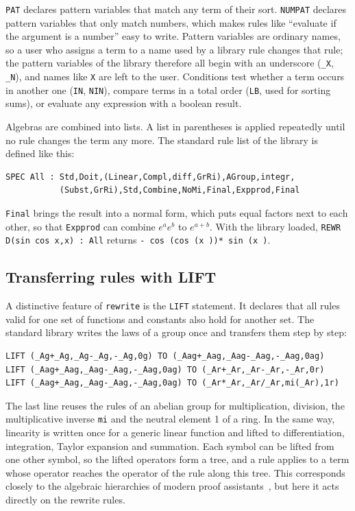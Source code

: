 \documentclass[11pt,a4paper]{article}
\begin{document}
\texttt{PAT} declares pattern variables that match any term of their sort.
\texttt{NUMPAT} declares pattern variables that only match numbers, which makes
rules like ``evaluate if the argument is a number'' easy to write. Pattern
variables are ordinary names, so a user who assigns a term to a name used
by a library rule changes that rule; the pattern variables of the library
therefore all begin with an underscore (\texttt{\_X}, \texttt{\_N}), and
names like \texttt{X} are left to the user.
Conditions test whether a term occurs in another one (\texttt{IN},
\texttt{NIN}), compare terms in a total order (\texttt{LB}, used for
sorting sums), or evaluate any expression with a boolean result.

Algebras are combined into lists. A list in parentheses is applied
repeatedly until no rule changes the term any more. The standard rule list
of the library is defined like this:

\begin{lstlisting}
SPEC All : Std,Doit,(Linear,Compl,diff,GrRi),AGroup,integr,
           (Subst,GrRi),Std,Combine,NoMi,Final,Expprod,Final
\end{lstlisting}

\texttt{Final} brings the result into a normal form, which puts equal
factors next to each other, so that \texttt{Expprod} can combine
$e^a e^b$ to $e^{a+b}$. With the library loaded,
\texttt{REWR D(sin cos x,x) : All} returns
\texttt{- cos (cos (x ))* sin (x )}.

\subsection{Transferring rules with LIFT}

A distinctive feature of \texttt{rewrite} is the \texttt{LIFT} statement.
It declares that all rules valid for one set of functions and constants
also hold for another set. The standard library writes the laws of a group
once and transfers them step by step:

\begin{lstlisting}
LIFT (_Ag+_Ag,_Ag-_Ag,-_Ag,0g) TO (_Aag+_Aag,_Aag-_Aag,-_Aag,0ag)
LIFT (_Aag+_Aag,_Aag-_Aag,-_Aag,0ag) TO (_Ar+_Ar,_Ar-_Ar,-_Ar,0r)
LIFT (_Aag+_Aag,_Aag-_Aag,-_Aag,0ag) TO (_Ar*_Ar,_Ar/_Ar,mi(_Ar),1r)
\end{lstlisting}

The last line reuses the rules of an abelian group for multiplication,
division, the multiplicative inverse \texttt{mi} and the neutral element 1
of a ring. In the same way, linearity is written once for a generic linear
function and lifted to differentiation, integration, Taylor expansion and
summation. Each symbol can be lifted from one other symbol, so the lifted
operators form a tree, and a rule applies to a term whose operator reaches
the operator of the rule along this tree. This corresponds closely to the
algebraic hierarchies of modern proof assistants~\cite{mathlib2020}, but
here it acts directly on the rewrite rules.
\end{document}
